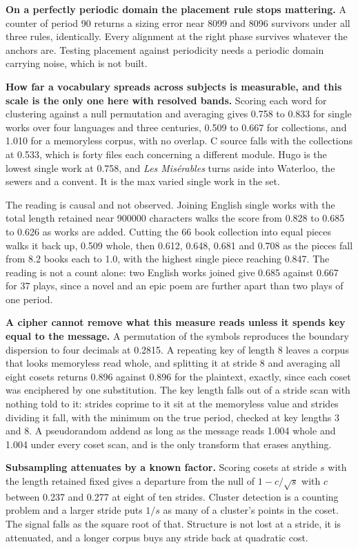 \textbf{On a perfectly periodic domain the placement rule stops mattering.} A counter of period 90 returns a sizing error near 8099 and 8096 survivors under all three rules, identically. Every alignment at the right phase survives whatever the anchors are. Testing placement against periodicity needs a periodic domain carrying noise, which is not built.

\textbf{How far a vocabulary spreads across subjects is measurable, and this scale is the only one here with resolved bands.} Scoring each word for clustering against a null permutation and averaging gives 0.758 to 0.833 for single works over four languages and three centuries, 0.509 to 0.667 for collections, and 1.010 for a memoryless corpus, with no overlap. C source falls with the collections at 0.533, which is forty files each concerning a different module. Hugo is the lowest single work at 0.758, and \emph{Les Misérables} turns aside into Waterloo, the sewers and a convent. It is the max varied single work in the set.

The reading is causal and not observed. Joining English single works with the total length retained near 900000 characters walks the score from 0.828 to 0.685 to 0.626 as works are added. Cutting the 66 book collection into equal pieces walks it back up, 0.509 whole, then 0.612, 0.648, 0.681 and 0.708 as the pieces fall from 8.2 books each to 1.0, with the highest single piece reaching 0.847. The reading is not a count alone: two English works joined give 0.685 against 0.667 for 37 plays, since a novel and an epic poem are further apart than two plays of one period.

\textbf{A cipher cannot remove what this measure reads unless it spends key equal to the message.} A permutation of the symbols reproduces the boundary dispersion to four decimals at 0.2815. A repeating key of length 8 leaves a corpus that looks memoryless read whole, and splitting it at stride 8 and averaging all eight cosets returns 0.896 against 0.896 for the plaintext, exactly, since each coset was enciphered by one substitution. The key length falls out of a stride scan with nothing told to it: strides coprime to it sit at the memoryless value and strides dividing it fall, with the minimum on the true period, checked at key lengths 3 and 8. A pseudorandom addend as long as the message reads 1.004 whole and 1.004 under every coset scan, and is the only transform that erases anything.

\textbf{Subsampling attenuates by a known factor.} Scoring cosets at stride \(s\) with the length retained fixed gives a departure from the null of \(1 - c/\sqrt{s}\) with \(c\) between 0.237 and 0.277 at eight of ten strides. Cluster detection is a counting problem and a larger stride puts \(1/s\) as many of a cluster's points in the coset. The signal falls as the square root of that. Structure is not lost at a stride, it is attenuated, and a longer corpus buys any stride back at quadratic cost.

